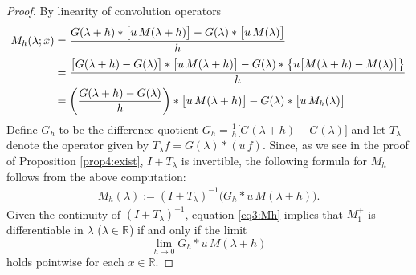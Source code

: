\documentclass[../dissertation.tex]{subfiles}
\begin{document}
\begin{proof}
	By linearity of convolution operators 
	\begin{align*}
		M_h(\lambda; x)
			&= 
				\frac{
					G(\lambda+h)* \big[u\,M(\lambda+h)\big]
					-G(\lambda) * \big[u\,M(\lambda)\big]
				}
				{h} \\[.1\baselineskip]
			&= 
				\frac{
					\big[
						G(\lambda+h) - G(\lambda)
					\big]
						* \big[u\,M(\lambda+h)\big]
					- G(\lambda) 
						* 
							\big\{
								u
								\big[
									M(\lambda+h)
									-M(\lambda)
								\big]
							\big\}
				}
				{h} \\
			&= 
				\left(
					\frac{G(\lambda+h)-G(\lambda)}{h}
				\right)
					* \big[u\,M(\lambda+h)\big]
				- G(\lambda) 
					* \big[ u \, M_h(\lambda) \big]
	\end{align*}
	Define $G_h$ to be the difference quotient 
	$G_h = \frac{1}{h}\big[G(\lambda+h) - G(\lambda)\big]$ and let 
	$T_\lambda$ denote the operator given by $T_\lambda f = G(\lambda)*(u\,f)$.
	Since, as we see in the proof of Proposition \ref{prop4:exist}, $I + T_\lambda$
	is invertible, the following formula for $M_h$ follows from the above 
	computation:
	\begin{align}\label{eq3:Mh}
		M_h(\lambda) := (I + T_\lambda)^{-1} \big(G_h * u\, M(\lambda+h)\big).
	\end{align}
	Given the continuity of $(I + T_\lambda)^{-1}$, equation \eqref{eq3:Mh}
	implies that $M_1^+$ is differentiable in $\lambda$ ($\lambda \in \mathbb R$)
	if and only if the limit 
	\[
		\lim_{h\to0} G_h * u\, M(\lambda+h)
	\]
	holds pointwise for each $x \in \mathbb R$. 


\end{proof}
\end{document}
